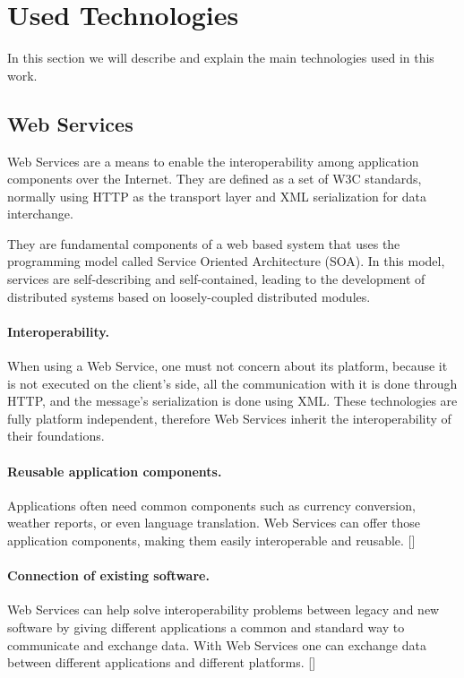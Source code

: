 \section{Used Technologies}
\label{used-technologies}
In this section we will describe and explain the main technologies used in this work.

\subsection{Web Services}
Web Services are a means to enable the interoperability among application components over the Internet.  They are defined as a set of W3C standards, normally using HTTP as the transport layer and XML serialization for data interchange.

They are fundamental components of a web based system that uses the programming model called Service Oriented Architecture (SOA). In this model, services are self-describing and self-contained, leading to the development of distributed systems based on loosely-coupled distributed modules.

\paragraph{Interoperability.}
When using a Web Service, one must not concern about its platform, because it is not executed on the client's side, all the communication with it is done through HTTP, and the message's serialization is done using XML. These technologies are fully platform independent, therefore Web Services inherit the interoperability of their foundations. 

\paragraph{Reusable application components.}
Applications often need common components such as currency conversion, weather reports, or even language translation. Web Services can offer those application components, making them easily interoperable and reusable.  [\citet{WST}]

\paragraph{Connection of existing software.}
Web Services can help solve interoperability problems between legacy and new software by giving different applications a common and standard way to communicate and exchange data. With Web Services one can exchange data between different applications and different platforms. [\citet{WST}]

